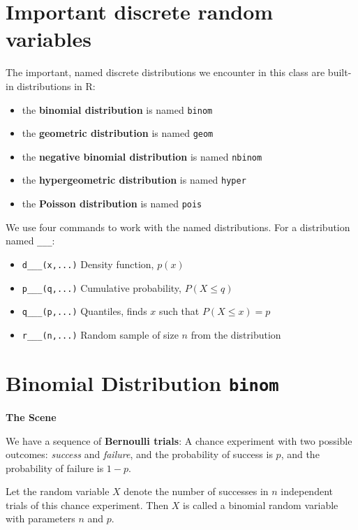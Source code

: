 \documentclass[
]{book}
\providecommand{\tightlist}{%
  \setlength{\itemsep}{0pt}\setlength{\parskip}{0pt}}
\theoremstyle{definition}
\theoremstyle{definition}
\theoremstyle{definition}
\theoremstyle{definition}
\theoremstyle{remark}
\begin{document}
\section{Important discrete random variables}\label{r-4distn-functions}

The important, named discrete distributions we encounter in this class are built-in distributions in R:

\begin{itemize}
\tightlist
\item
  the \textbf{binomial distribution} is named \texttt{binom}
\item
  the \textbf{geometric distribution} is named \texttt{geom}
\item
  the \textbf{negative binomial distribution} is named \texttt{nbinom}
\item
  the \textbf{hypergeometric distribution} is named \texttt{hyper}
\item
  the \textbf{Poisson distribution} is named \texttt{pois}
\end{itemize}

We use four commands to work with the named distributions. For a distribution named \texttt{\_\_\_}:

\begin{itemize}
\tightlist
\item
  \texttt{d\_\_\_(x,...)} \textbar{} Density function, \(p(x)\)
\item
  \texttt{p\_\_\_(q,...)} \textbar{} Cumulative probability, \(P(X \leq q)\)
\item
  \texttt{q\_\_\_(p,...)} \textbar{} Quantiles, finds \(x\) such that \(P(X \leq x) = p\)
\item
  \texttt{r\_\_\_(n,...)} \textbar{} Random sample of size \(n\) from the distribution
\end{itemize}

\section{\texorpdfstring{Binomial Distribution \texttt{binom}}{Binomial Distribution binom}}\label{binomial-distribution-binom}

\textbf{The Scene}

We have a sequence of \textbf{Bernoulli trials}: A chance experiment with two possible outcomes: \emph{success} and \emph{failure}, and the probability of success is \(p\), and the probability of failure is \(1-p\).

Let the random variable \(X\) denote the number of successes in \(n\) independent trials of this chance experiment. Then \(X\) is called a binomial random variable with parameters \(n\) and \(p\).
\end{document}
